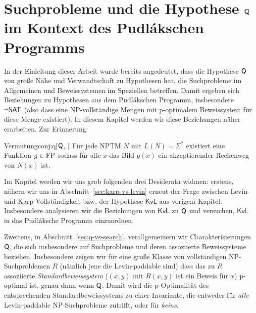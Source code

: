 \chapter{Suchprobleme und die Hypothese $\mathsf{Q}$ im Kontext des Pudlákschen Programms}\label{chap:pudlak}


In der Einleitung dieser Arbeit wurde bereits angedeutet, dass die Hypothese $\mathsf{Q}$ von \citeauthor{fenner_inverting_2003} große Nähe und Verwandtschaft zu Hypothesen hat, die Suchprobleme im Allgemeinen und Beweissystemen im Speziellen betreffen. Damit ergeben sich Beziehungen zu Hypothesen aus dem Pudlákschen Programm, insbesondere $\neg\mathsf{SAT}$ (also dass eine NP-vollständige Mengen mit p-optimalem Beweissystem für diese Menge existiert).
In diesem Kapitel werden wir diese Beziehungen näher erarbeiten. Zur Erinnerung:

\begin{reptheorem}{Vermutung}{conj:q}[$\mathsf{Q}$, \cite{fenner_inverting_2003}]
    Für jede NPTM $N$ mit $L(N)=\Sigma^*$ existiert eine Funktion $g\in\mathrm{FP}$ sodass für alle $x$ das Bild $g(x)$ ein akzeptierender Rechenweg von $N(x)$ ist. 
\end{reptheorem}

Im Kapitel werden wir uns grob folgenden drei Desiderata widmen: 
erstens, nähern wir uns in Abschnitt~\ref{sec:karp-vs-levin} erneut der Frage zwischen Levin- und Karp-Vollständigkeit bzw. der Hypothese $\mathsf{KvL}$ aus vorigem Kapitel. Insbesondere analysieren wir die Beziehungen von $\mathsf{KvL}$ zu $\mathsf{Q}$ und versuchen, $\mathsf{KvL}$ in das Pudláksche Programm einzuordnen.

Zweitens, in Abschnitt~\ref{sec:q-vs-search}, verallgemeinern wir Charakterisierungen $\mathsf{Q}$, die sich insbesondere auf Suchprobleme und deren assoziierte Beweissysteme beziehen.
Insbesondere zeigen wir für eine große Klasse von vollständigen NP-Suchproblemen $R$ (nämlich jene die Levin-paddable sind) dass das zu $R$ assoziierte \emph{Standardbeweissystem} ($(x,y)$ mit $R(x,y)$ ist ein Beweis für $x$) p-optimal ist, genau dann wenn $\mathsf{Q}$. Damit wird die p-Optimalität des entsprechenden Standardbeweissystems zu einer Invariante, die entweder für \emph{alle} Levin-paddable NP-Suchprobleme zutrifft, oder für \emph{keins}.



